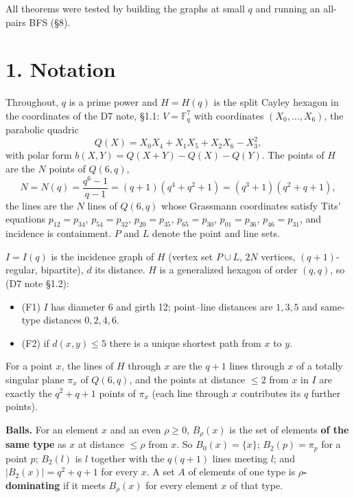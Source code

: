 \documentclass[
  10pt,
]{article}
\providecommand{\tightlist}{%
  \setlength{\itemsep}{0pt}\setlength{\parskip}{0pt}}
\begin{document}
All theorems were tested by building the graphs at small \(q\) and
running an all-pairs BFS (§8).

\hypertarget{notation}{%
\section{1. Notation}\label{notation}}

Throughout, \(q\) is a prime power and \(H = H(q)\) is the split Cayley
hexagon in the coordinates of the D7 note, §1.1: \(V = \mathbb F_q^7\)
with coordinates \((X_0,\dots,X_6)\), the parabolic quadric
\[Q(X) = X_0X_4 + X_1X_5 + X_2X_6 - X_3^2,\] with polar form
\(b(X,Y) = Q(X+Y)-Q(X)-Q(Y)\). The points of \(H\) are the \(N\) points
of \(Q(6,q)\),
\[N = N(q) = \frac{q^6-1}{q-1} = (q+1)(q^4+q^2+1) = (q^3+1)(q^2+q+1),\]
the lines are the \(N\) lines of \(Q(6,q)\) whose Grassmann coordinates
satisfy Tits' equations \(p_{12}=p_{34}\), \(p_{54}=p_{32}\),
\(p_{20}=p_{35}\), \(p_{65}=p_{30}\), \(p_{01}=p_{36}\),
\(p_{46}=p_{31}\), and incidence is containment. \(P\) and \(L\) denote
the point and line sets.

\(I = I(q)\) is the incidence graph of \(H\) (vertex set \(P\cup L\),
\(2N\) vertices, \((q+1)\)-regular, bipartite), \(d\) its distance.
\(H\) is a generalized hexagon of order \((q,q)\), so (D7 note §1.2):

\begin{itemize}
\tightlist
\item
  (F1) \(I\) has diameter 6 and girth 12; point--line distances are
  \(1,3,5\) and same-type distances \(0,2,4,6\).
\item
  (F2) if \(d(x,y)\le 5\) there is a unique shortest path from \(x\) to
  \(y\).
\end{itemize}

For a point \(x\), the lines of \(H\) through \(x\) are the \(q+1\)
lines through \(x\) of a totally singular plane \(\pi_x\) of \(Q(6,q)\),
and the points at distance \(\le 2\) from \(x\) in \(I\) are exactly the
\(q^2+q+1\) points of \(\pi_x\) (each line through \(x\) contributes its
\(q\) further points).

\textbf{Balls.} For an element \(x\) and an even \(\rho\ge 0\),
\(B_\rho(x)\) is the set of elements \textbf{of the same type} as \(x\)
at distance \(\le\rho\) from \(x\). So \(B_0(x)=\{x\}\);
\(B_2(p)=\pi_p\) for a point \(p\); \(B_2(l)\) is \(l\) together with
the \(q(q+1)\) lines meeting \(l\); and \(|B_2(x)| = q^2+q+1\) for every
\(x\). A set \(A\) of elements of one type is
\textbf{\(\rho\)-dominating} if it meets \(B_\rho(x)\) for every element
\(x\) of that type.
\end{document}
